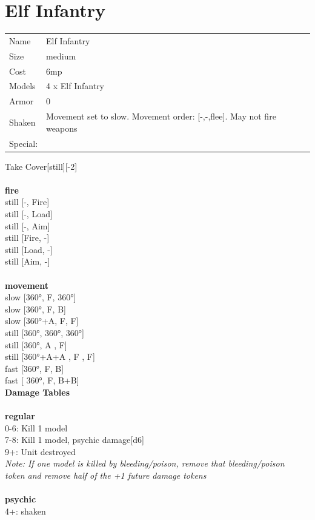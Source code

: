 \clearpage

\section{ Elf Infantry }

\begin{tabular}{ll}
  Name & Elf Infantry \\
  Size & medium\\
  Cost & 6mp\\
  Models & 4 x Elf Infantry\\
  Armor & 0\\
  Shaken & Movement set to slow. Movement order: [-,-,flee]. May not fire weapons\\
  Special: \\
\end{tabular}

\noindent Take Cover[still][-2]\\ 


\ \\ {\bf fire } \\
still [-, Fire] \\
still [-, Load] \\
still [-, Aim] \\
still [Fire, -] \\
still [Load, -] \\
still [Aim, -] \\
\ \\ {\bf movement } \\
slow [360°, F, 360°] \\
slow [360°, F, B] \\
slow [360°+A, F, F] \\
still [360°, 360°, 360°] \\
still [360°, A , F] \\
still [360°+A+A , F , F] \\
fast [360°, F, B] \\
fast [ 360°,  F, B+B] \\


{\bf Damage Tables} \\
\ \\ {\bf regular } \\
0-6: Kill 1 model \\
7-8: Kill 1 model, psychic damage[d6] \\
9+: Unit destroyed \\
{{\it Note: If one model is killed by bleeding/poison, remove that bleeding/poison \\ token and remove half of the +1 future damage tokens}} \\
\ \\ {\bf psychic } \\
4+: shaken \\



